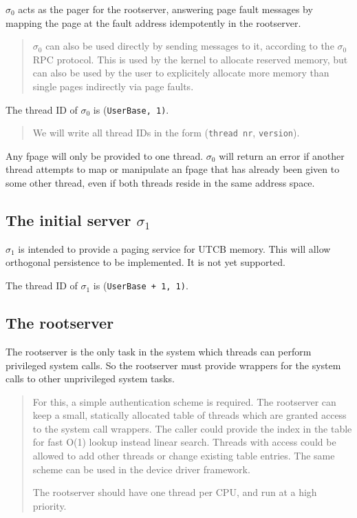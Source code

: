 \documentclass[9pt,a4paper]{extarticle}
\newenvironment{comment}{\footnotesize \begin{quote}}{\end{quote}}
\begin{document}
$\sigma_0$ acts as the pager for the rootserver, answering page fault
messages by mapping the page at the fault address idempotently in the
rootserver.

\begin{comment}
  $\sigma_0$ can also be used directly by sending messages to it,
  according to the $\sigma_0$ RPC protocol.  This is used by the kernel
  to allocate reserved memory, but can also be used by the user to
  explicitely allocate more memory than single pages indirectly via
  page faults.
\end{comment}

The thread ID of $\sigma_0$ is (\verb/UserBase, 1)/.

\begin{comment}
  We will write all thread IDs in the form (\verb/thread nr/,
  \verb/version/).
\end{comment}

Any fpage will only be provided to one thread.  $\sigma_0$ will return
an error if another thread attempts to map or manipulate an fpage that
has already been given to some other thread, even if both threads
reside in the same address space.


\subsection{The initial server $\sigma_1$}

$\sigma_1$ is intended to provide a paging service for UTCB memory.
This will allow orthogonal persistence to be implemented.  It is not
yet supported.

The thread ID of $\sigma_1$ is (\verb/UserBase + 1, 1)/.


\subsection{The rootserver}
\label{rootserver}

The rootserver is the only task in the system which threads can
perform privileged system calls.  So the rootserver must provide
wrappers for the system calls to other unprivileged system tasks.

\begin{comment}
  For this, a simple authentication scheme is required.  The
  rootserver can keep a small, statically allocated table of threads
  which are granted access to the system call wrappers.  The caller
  could provide the index in the table for fast O(1) lookup instead
  linear search.  Threads with access could be allowed to add other
  threads or change existing table entries.  The same scheme can be
  used in the device driver framework.
  
  The rootserver should have one thread per CPU, and run at a high
  priority.
\end{comment}
\end{document}
